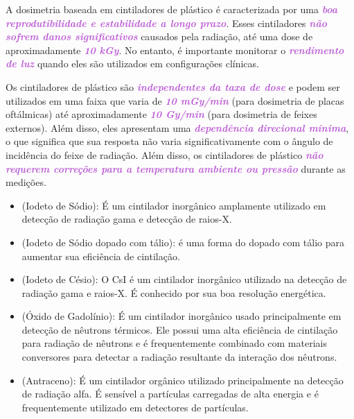 \documentclass[11pt,a4paper]{article}
\begin{document}
		A dosimetria baseada em cintiladores de plástico é caracterizada por uma \textcolor{MediumOrchid}{\textit{\textbf{boa reprodutibilidade e estabilidade a longo prazo}}}. Esses cintiladores \textcolor{MediumOrchid}{\textit{\textbf{não sofrem danos significativos}}} causados pela radiação, até uma dose de aproximadamente \textcolor{MediumOrchid}{\textit{\textbf{10 kGy}}}. No entanto, é importante monitorar o \textcolor{MediumOrchid}{\textit{\textbf{rendimento de luz}}} quando eles são utilizados em configurações clínicas.

		Os cintiladores de plástico são \textcolor{MediumOrchid}{\textit{\textbf{independentes da taxa de dose}}} e podem ser utilizados em uma faixa que varia de \textcolor{MediumOrchid}{\textit{\textbf{10 mGy/min}}} (para dosimetria de placas oftálmicas) até aproximadamente \textcolor{MediumOrchid}{\textit{\textbf{10 Gy/min}}} (para dosimetria de feixes externos). Além disso, eles apresentam uma \textcolor{MediumOrchid}{\textit{\textbf{dependência direcional mínima}}}, o que significa que sua resposta não varia significativamente com o ângulo de incidência do feixe de radiação. Além disso, os cintiladores de plástico \textcolor{MediumOrchid}{\textit{\textbf{não requerem correções para a temperatura ambiente ou pressão}}} durante as medições.

	\begin{tcolorbox}[width=\textwidth, colback={white}, colbacktitle={DarkTurquoise!50!white}, title={$\bigstar$ \LobsterTwo{Principais Materiais Cintiladores} $\bigstar$}, coltitle={CarnationPink}, colframe={DarkTurquoise}, fonttitle=\rmfamily\bfseries\Large, breakable]

		\begin{itemize}[label=\textcolor{CarnationPink}{$\star$}]
			\item \textcolor{DarkTurquoise}{\textbf{}} (Iodeto de Sódio): É um cintilador inorgânico amplamente utilizado em detecção de radiação gama e detecção de raios-X.
			\item \textcolor{DarkTurquoise}{\textbf{}} (Iodeto de Sódio dopado com tálio): é uma forma do  dopado com tálio para aumentar sua eficiência de cintilação.
			\item \textcolor{DarkTurquoise}{\textbf{}} (Iodeto de Césio): O CsI é um cintilador inorgânico utilizado na detecção de radiação gama e raios-X. É conhecido por sua boa resolução energética.
			\item \textcolor{DarkTurquoise}{\textbf{}} (Óxido de Gadolínio): É um cintilador inorgânico usado principalmente em detecção de nêutrons térmicos. Ele possui uma alta eficiência de cintilação para radiação de nêutrons e é frequentemente combinado com materiais conversores para detectar a radiação resultante da interação dos nêutrons.
			\item \textcolor{DarkTurquoise}{\textbf{}} (Antraceno): É um cintilador orgânico utilizado principalmente na detecção de radiação alfa. É sensível a partículas carregadas de alta energia e é frequentemente utilizado em detectores de partículas.
		\end{itemize}
	\end{tcolorbox}
	
\end{document}
